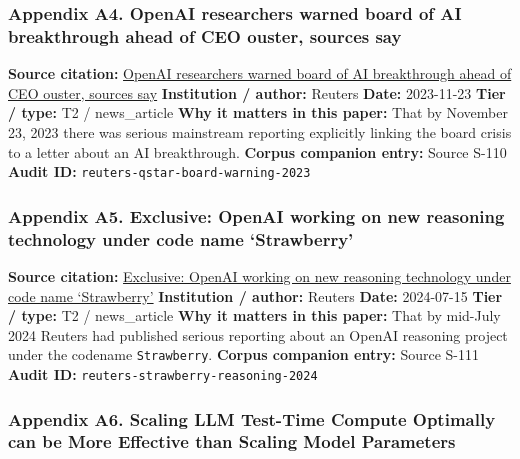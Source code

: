 \documentclass[
  american,
  11pt,
  letterpaper,
]{article}
\begin{document}
\subsubsection{Appendix A4. OpenAI researchers warned board of AI
breakthrough ahead of CEO ouster, sources
say}\label{ch-06-appendix-a4-openai-researchers-warned-board-of-ai-breakthrough-ahead-of-ceo-ouster-sources-say}

\textbf{Source citation:}
\href{https://www.reuters.com/technology/sam-altmans-ouster-openai-was-precipitated-by-letter-board-about-ai-breakthrough-2023-11-22/}{OpenAI
researchers warned board of AI breakthrough ahead of CEO ouster, sources
say} \textbf{Institution / author:} Reuters \textbf{Date:} 2023-11-23
\textbf{Tier / type:} T2 / news\_article \textbf{Why it matters in this
paper:} That by November 23, 2023 there was serious mainstream reporting
explicitly linking the board crisis to a letter about an AI
breakthrough. \textbf{Corpus companion entry:} Source S-110
\textbf{Audit ID:} \texttt{reuters-qstar-board-warning-2023}

\subsubsection{Appendix A5. Exclusive: OpenAI working on new reasoning
technology under code name
`Strawberry'}\label{ch-06-appendix-a5-exclusive-openai-working-on-new-reasoning-technology-under-code-name-strawberry}

\textbf{Source citation:}
\href{https://www.reuters.com/technology/artificial-intelligence/openai-working-new-reasoning-technology-under-code-name-strawberry-2024-07-12/}{Exclusive:
OpenAI working on new reasoning technology under code name `Strawberry'}
\textbf{Institution / author:} Reuters \textbf{Date:} 2024-07-15
\textbf{Tier / type:} T2 / news\_article \textbf{Why it matters in this
paper:} That by mid-July 2024 Reuters had published serious reporting
about an OpenAI reasoning project under the codename
\texttt{Strawberry}. \textbf{Corpus companion entry:} Source S-111
\textbf{Audit ID:} \texttt{reuters-strawberry-reasoning-2024}

\subsubsection{Appendix A6. Scaling LLM Test-Time Compute Optimally can
be More Effective than Scaling Model
Parameters}\label{ch-06-appendix-a6-scaling-llm-test-time-compute-optimally-can-be-more-effective-than-scaling-model-parameters}
\end{document}
